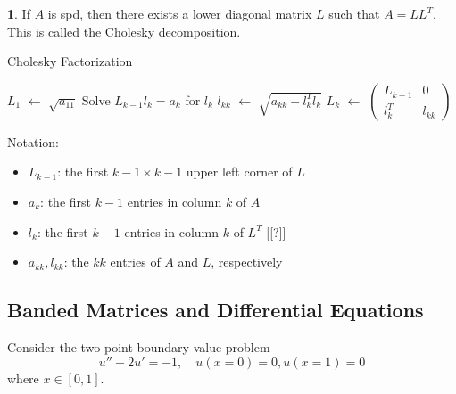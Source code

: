 \documentclass[12pt]{article}
\theoremstyle{definition}
\newcommand{\R}{\mathbb{R}}
\newcommand*\Let[2]{\State #1 $\gets$ #2}
\newtheorem{theorem}{\color{ForestGreen}{\textbf{Theorem}}}
\theoremstyle{definition}
\begin{document}
\begin{theorem}
If $A$ is spd, then there exists a lower diagonal matrix $L$ such that $A = L L^T$. This is called the Cholesky decomposition. 
\end{theorem}

\begin{algorithm}
  \caption{Cholesky Factorization}
  \begin{algorithmic}[ht]
    \Require{$A \in \R^{n \times n}$, SPD}
    \Let{$L_1$}{$\sqrt{a_{11}}$}
    	\State Solve $L_{k-1} l_k = a_k$ for $l_k$
    	\Let{$l_{kk}$}{$\sqrt{a_{kk} - l_k^T l_k}$}
    	\Let{$L_k$}{$\begin{pmatrix} L_{k-1} & 0 \\ l_k^T & l_{kk} \end{pmatrix}$}
    \EndFor
  \end{algorithmic}
\end{algorithm}
Notation:
\begin{itemize}
	\item $L_{k-1}$: the first $k-1 \times k-1$ upper left corner of $L$
	\item $a_k$: the first $k-1$ entries in column $k$ of $A$
	\item $l_k$: the first $k-1$ entries in column $k$ of $L^T$ [[?]]
	\item $a_{kk}, l_{kk}$: the $kk$ entries of $A$ and $L$, respectively
\end{itemize}

\subsection{Banded Matrices and Differential Equations}
Consider the two-point boundary value problem
\begin{equation}
	u'' + 2u' = -1, \quad u(x=0)=0, u(x=1)= 0
\end{equation}
where $x\in [0,1]$.
\end{document}
